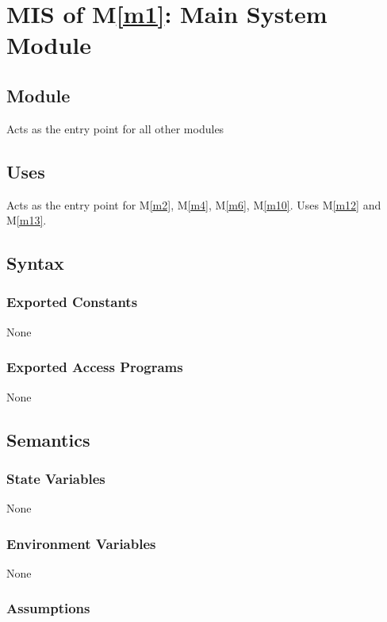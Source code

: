 \documentclass[12pt, titlepage]{article}
\begin{document}
\newpage

\section{MIS of M\ref{m1}: Main System Module}

\subsection{Module}

Acts as the entry point for all other modules

\subsection{Uses}

Acts as the entry point for M\ref{m2}, M\ref{m4}, M\ref{m6}, M\ref{m10}. Uses M\ref{m12} and M\ref{m13}.

\subsection{Syntax}

\subsubsection{Exported Constants}

None

\subsubsection{Exported Access Programs}

None

\subsection{Semantics}

\subsubsection{State Variables}

None

\subsubsection{Environment Variables}

None

\subsubsection{Assumptions}
\end{document}
